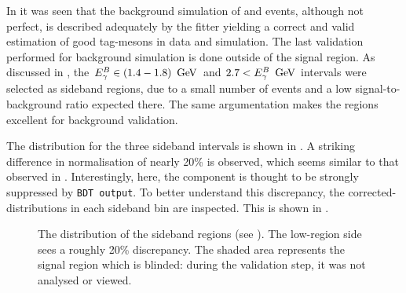 In  it was seen that the background simulation of \qqbar and \BB events,
although not perfect, is described adequately by the \Mbc fitter yielding a correct and valid estimation of good tag-\B mesons in data and simulation.
The last validation performed for background simulation is done outside of the \EB signal region.
As discussed in , the ${E^B_{\gamma}}\in(1.4-1.8)~\mathrm{\,Ge\kern -0.1em V}$ and $2.7<{E^B_{\gamma}}~\mathrm{\,Ge\kern -0.1em V}$ intervals were selected as sideband regions, 
due to a small number of \BtoXsgamma events and a low signal-to-background ratio expected there.
The same argumentation makes the regions excellent for background validation.

The \EB distribution for the three \EB sideband intervals is shown in .
A striking difference in normalisation of nearly 20\% is observed, 
which seems similar to that observed in .
Interestingly, here, the \epem\ra\qqbar component is thought to be strongly suppressed by \texttt{BDT~output}.
To better understand this discrepancy, the corrected-\Mbc distributions in each \EB sideband bin are inspected.
This is shown in .
\begin{figure}[htbp!]
    \centering
    \caption{\label{fig:sidebands_eb} 
    The \EB distribution of the \EB sideband regions (see ).
    The low-\EB region side sees a roughly 20\% discrepancy.
    The shaded area represents the signal region which is blinded: during the validation step, it was not analysed or viewed.
    }
\end{figure}
